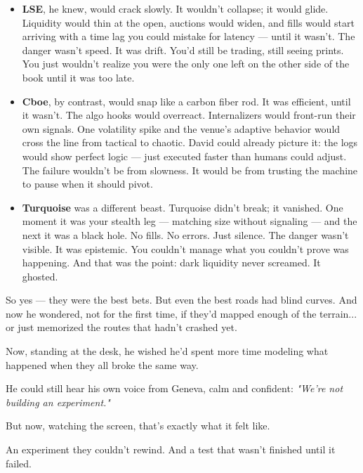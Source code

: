 \begin{itemize}
\item \textbf{LSE}, he knew, would crack slowly.
It wouldn’t collapse; it would glide. Liquidity would thin at the open, auctions would widen, and fills would start arriving with a time lag you could mistake for latency — until it wasn’t.
The danger wasn’t speed. It was drift. You’d still be trading, still seeing prints. You just wouldn’t realize you were the only one left on the other side of the book until it was too late.

\item \textbf{Cboe}, by contrast, would snap like a carbon fiber rod.
It was efficient, until it wasn’t. The algo hooks would overreact. Internalizers would front-run their own signals. One volatility spike and the venue’s adaptive behavior would cross the line from tactical to chaotic.
David could already picture it: the logs would show perfect logic — just executed faster than humans could adjust.
The failure wouldn’t be from slowness. It would be from trusting the machine to pause when it should pivot.

\item \textbf{Turquoise} was a different beast.
Turquoise didn’t break; it vanished. One moment it was your stealth leg — matching size without signaling — and the next it was a black hole.
No fills. No errors. Just silence.
The danger wasn’t visible. It was epistemic.
You couldn’t manage what you couldn’t prove was happening. And that was the point: dark liquidity never screamed. It ghosted.
\end{itemize}

So yes — they were the best bets.
But even the best roads had blind curves.
And now he wondered, not for the first time, if they’d mapped enough of the terrain...
or just memorized the routes that hadn’t crashed yet.

Now, standing at the desk, he wished he’d spent more time modeling what happened when they all broke 
the same way.

He could still hear his own voice from Geneva, calm and confident:
\textit{"We’re not building an experiment."}

But now, watching the screen, that’s exactly what it felt like.

An experiment they couldn’t rewind.
And a test that wasn’t finished until it failed.

\medskip

